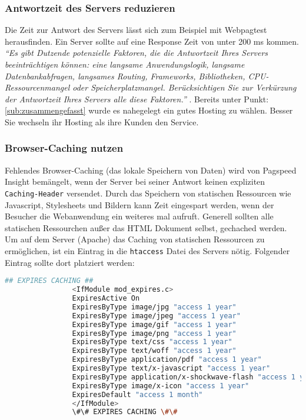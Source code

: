 			\subsubsection{Antwortzeit des Servers reduzieren} %
			\label{ssub:antwortzeit_des_servers_reduzieren}
				Die Zeit zur Antwort des Servers lässt sich zum Beispiel mit Webpagtest herausfinden. Ein Server sollte auf eine Response Zeit von unter 200 ms kommen. \textit{"`Es gibt Dutzende potenzielle Faktoren, die die Antwortzeit Ihres Servers beeinträchtigen können: eine langsame Anwendungslogik, langsame Datenbankabfragen, langsames Routing, Frameworks, Bibliotheken, CPU-Ressourcenmangel oder Speicherplatzmangel. Berücksichtigen Sie zur Verkürzung der Antwortzeit Ihres Servers alle diese Faktoren."'} \autocite{google15}. Bereits unter Punkt: \ref{sub:zusammengefasst} wurde es nahegelegt ein gutes Hosting zu wählen. Besser Sie wechseln ihr Hosting als ihre Kunden den Service.

			\subsubsection{Browser-Caching nutzen} %
			\label{ssub:browser_caching_nutzen}
				Fehlendes Browser-Caching (das lokale Speichern von Daten) wird von Pagspeed Insight bemängelt, wenn der Server bei seiner Antwort keinen expliziten \texttt{Caching-Header} versendet.
				Durch das Speichern von statischen Ressourcen wie Javascript, Stylesheets und Bildern kann Zeit eingespart werden, wenn der Besucher die Webanwendung ein weiteres mal aufruft. Generell sollten alle statischen Ressourchen außer das HTML Dokument selbst, gechached werden.\\

				Um auf dem Server (Apache) das Caching von statischen Ressourcen zu ermöglichen, ist ein Eintrag in die \texttt{htaccess} Datei des Servers nötig. Folgender Eintrag sollte dort platziert werden:

			  \begin{lstlisting}[captionpos=b, caption=Aktivieren von Browser Caching in Apache (Listing nach: \autocite{sextonCaching}), label=lst:caching, language=bash]
			  	## EXPIRES CACHING ##
			  	<IfModule mod_expires.c>
			  	ExpiresActive On
			  	ExpiresByType image/jpg "access 1 year"
			  	ExpiresByType image/jpeg "access 1 year"
			  	ExpiresByType image/gif "access 1 year"
			  	ExpiresByType image/png "access 1 year"
			  	ExpiresByType text/css "access 1 year"
			  	ExpiresByType text/woff "access 1 year"
			  	ExpiresByType application/pdf "access 1 year"
			  	ExpiresByType text/x-javascript "access 1 year"
			  	ExpiresByType application/x-shockwave-flash "access 1 year"
			  	ExpiresByType image/x-icon "access 1 year"
			  	ExpiresDefault "access 1 month"
			  	</IfModule>
			  	\#\# EXPIRES CACHING \#\#
			  \end{lstlisting}


